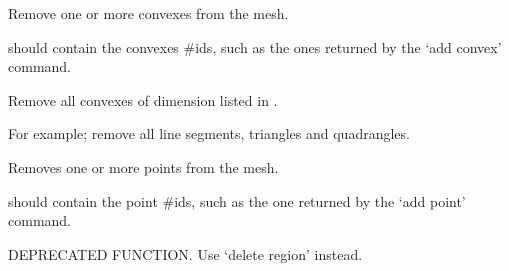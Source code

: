 \documentclass[a4paper,11pt,english]{sphinxmanual}
\begin{document}
\begin{fulllineitems}

\begin{fulllineitems}
\label{\detokenize{python/cmdref_Mesh:getfem.Mesh.del_convex}}
Remove one or more convexes from the mesh.

 should contain the convexes \#ids, such as the ones
returned by the ‘add convex’ command.

\end{fulllineitems}


\begin{fulllineitems}
\label{\detokenize{python/cmdref_Mesh:getfem.Mesh.del_convex_of_dim}}
Remove all convexes of dimension listed in .

For example;  remove
all line segments, triangles and quadrangles.

\end{fulllineitems}


\begin{fulllineitems}
\label{\detokenize{python/cmdref_Mesh:getfem.Mesh.del_point}}
Removes one or more points from the mesh.

 should contain the point \#ids, such as the one returned by
the ‘add point’ command.

\end{fulllineitems}


\begin{fulllineitems}
\label{\detokenize{python/cmdref_Mesh:getfem.Mesh.delete_boundary}}
DEPRECATED FUNCTION. Use ‘delete region’ instead.


\end{fulllineitems}
\end{fulllineitems}
\end{document}
